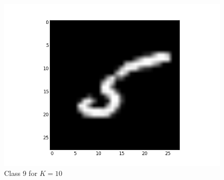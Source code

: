 \documentclass[submit]{harvardml}
\begin{document}
\begin{figure}[ht]
    \includegraphics[scale=0.20]{representative-8-2}
    \caption{Class 9 for $K=10$}
\end{figure}
\end{document}
